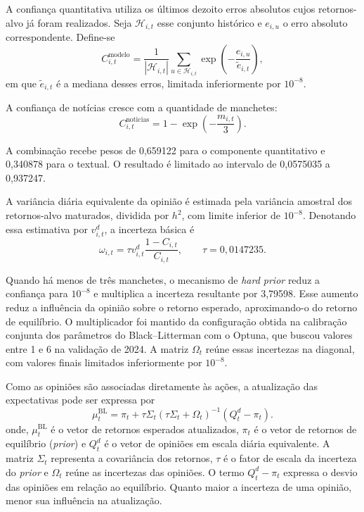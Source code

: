 A confiança quantitativa utiliza os últimos dezoito
erros absolutos cujos retornos-alvo já foram realizados.
Seja $\mathcal{H}_{i,t}$ esse conjunto histórico e
$e_{i,u}$ o erro absoluto correspondente. Define-se
\begin{equation}
C_{i,t}^{\mathrm{modelo}}
=
\frac{1}{|\mathcal{H}_{i,t}|}
\sum_{u\in\mathcal{H}_{i,t}}
\exp\left(
-\frac{e_{i,u}}{\widetilde{e}_{i,t}}
\right),
\label{eq:confianca_modelo}
\end{equation}
em que $\widetilde{e}_{i,t}$ é a mediana desses erros,
limitada inferiormente por $10^{-8}$.

A confiança de notícias cresce com a quantidade
de manchetes:
\begin{equation}
C_{i,t}^{\mathrm{noticias}}
=
1-\exp\left(-\frac{m_{i,t}}{3}\right).
\label{eq:confianca_noticias}
\end{equation}

A combinação recebe pesos de 0,659122 para o componente
quantitativo e 0,340878 para o textual. O resultado
é limitado ao intervalo de 0,0575035 a 0,937247.

A variância diária equivalente da opinião é estimada
pela variância amostral dos retornos-alvo maturados,
dividida por $h^2$, com limite inferior de $10^{-8}$.
Denotando essa estimativa por $v_{i,t}^{d}$, a incerteza
básica é
\begin{equation}
\omega_{i,t}
=
\tau v_{i,t}^{d}
\frac{1-C_{i,t}}{C_{i,t}},
\qquad
\tau=0,0147235.
\label{eq:omega_cap4}
\end{equation}

Quando há menos de três manchetes, o mecanismo de
\emph{hard prior} reduz a confiança para $10^{-8}$ e
multiplica a incerteza resultante por 3,79598. Esse
aumento reduz a influência da opinião sobre o retorno
esperado, aproximando-o do retorno de equilíbrio.
O multiplicador foi mantido da configuração obtida
na calibração conjunta dos parâmetros do
Black--Litterman com o Optuna, que buscou valores
entre 1 e 6 na validação de 2024. A matriz $\Omega_t$
reúne essas incertezas na diagonal, com valores finais
limitados inferiormente por $10^{-8}$.

Como as opiniões são associadas diretamente às ações,
a atualização das expectativas pode ser expressa por
\begin{equation}
\mu_t^{\mathrm{BL}}
=
\pi_t
+
\tau\Sigma_t
\left(
\tau\Sigma_t+\Omega_t
\right)^{-1}
\left(
Q_t^{d}-\pi_t
\right).
\label{eq:posterior_experimental}
\end{equation}
\noindent onde, $\mu_t^{\mathrm{BL}}$ é o vetor de retornos
esperados atualizados, $\pi_t$ é o vetor de retornos de
equilíbrio (\emph{prior}) e $Q_t^{d}$ é o vetor de opiniões
em escala diária equivalente. A matriz $\Sigma_t$ representa
a covariância dos retornos, $\tau$ é o fator de escala da
incerteza do \emph{prior} e $\Omega_t$ reúne as incertezas
das opiniões. O termo $Q_t^{d}-\pi_t$ expressa o desvio das
opiniões em relação ao equilíbrio. Quanto maior a incerteza
de uma opinião, menor sua influência na atualização.

